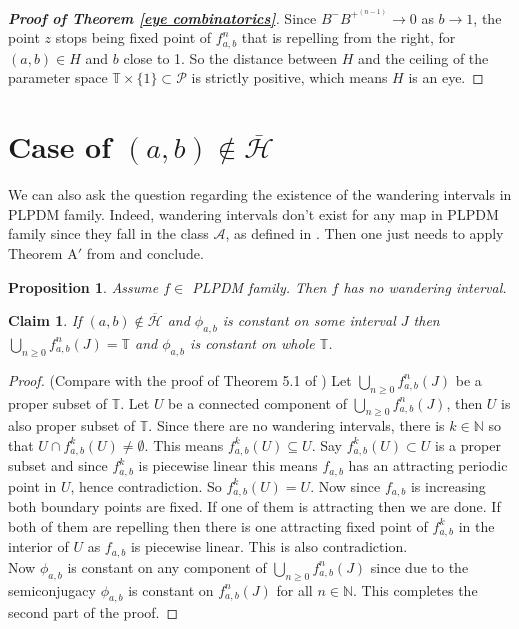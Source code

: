 \documentclass[12pt]{amsart}
\numberwithin{equation}{section}
\newtheorem{proposition}{Proposition}[section]
\newtheorem{claim}[theorem]{Claim}
\theoremstyle{remark}
\begin{document}
{\begin{proof}[\textbf{Proof of Theorem \ref{eye combinatorics}}]
    Since $B^-B^{+^{(n-1)}} \to 0$ as $b \to 1$, the point $z$ stops being fixed point of  $f_{a,b}^n$ that is repelling from the right, for $(a,b) \in H$ and $b$ close to 1. So the distance between $H$ and the ceiling of the parameter space $\mathbb{T}\times\{1\} \subset \mathcal P$ is strictly positive, which means $H$ is an eye. 
\end{proof}
\section{Case of  
  $(a,b) \notin \overline{\mathcal{H}}$}
We can also ask the question regarding the existence of the  wandering intervals in PLPDM family. Indeed, wandering intervals don't exist for any map in PLPDM family since they fall in the class $\mathcal{A}$, as defined in \cite{MMS}. 
Then one just needs to apply Theorem A$'$ from \cite{MMS} and conclude.
\begin{proposition}
    Assume $f \in$ PLPDM family. Then $f$ has no wandering interval.
\end{proposition}

            
   
\begin{claim}\label{inj semoconj}
      If $(a,b) \notin \overline{\mathcal{H}}$ and $\phi_{a,b}$ is constant on some interval $J$ then $\bigcup_{n\geq0} f_{a,b}^n(J)=\mathbb{T}$ and $\phi_{a,b}$ is constant on whole $\mathbb{T}$.
\end{claim}
\begin{proof}{(Compare with the proof of Theorem 5.1 of \cite{MMS})}
    Let $\bigcup_{n\geq0} f_{a,b}^n(J)$ be a proper subset of  $\mathbb{T}$.  Let $U$ be a connected component of $\bigcup_{n\geq0} f_{a,b}^n(J)$, then $U$ is also proper subset of $\mathbb{T}$. Since there are no wandering intervals, there is $k \in \mathbb{N}$ so that $U\cap f_{a,b}^k(U) \neq \emptyset$. This means $f_{a,b}^k(U) \subseteq U$. Say $f_{a,b}^k(U) \subset U$ is a proper subset and since $f^k_{a,b}$ is piecewise linear this means $f_{a,b}$ has an attracting periodic point in $U$, hence contradiction. So $f_{a,b}^k(U)=U$. Now since $f_{a,b}$ is increasing both boundary points are fixed. If one of them is attracting then we are done. If both of them are repelling then there is one attracting fixed point of $f_{a,b}^k$ in the interior of $U$ as $f_{a,b}$ is piecewise linear. This is also contradiction.\\
\indent    Now $\phi_{a,b}$ is constant on any component of $\bigcup_{n\geq0} f_{a,b}^n(J)$ since due to the semiconjugacy $\phi_{a,b}$ is constant on $f_{a,b}^n(J)$ for all $n \in \mathbb{N}$. This completes the second part of the proof.
\end{proof}




}
\end{document}
